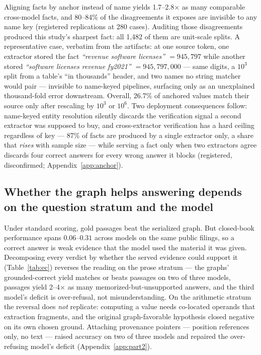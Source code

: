 \documentclass{article}
\begin{document}
Aligning facts by anchor instead of name yields 1.7--2.8$\times$ as many
comparable cross-model facts, and 80--84\% of the disagreements it exposes
are invisible to any name key (registered replications at 280 cases). Auditing those disagreements produced this study's sharpest fact: all
1,482 of them are unit-scale splits. A representative case, verbatim from
the artifacts: at one source token, one extractor stored the fact
\emph{``revenue software licenses'' $= 945{,}797$} while another stored
\emph{``software licenses revenue fy2021'' $= 945{,}797{,}000$} --- same
digits, a $10^3$ split from a table's ``in thousands'' header, and two
names no string matcher would pair --- invisible to name-keyed
pipelines, surfacing only as an unexplained thousand-fold error
downstream. Overall, 26.7\% of
anchored values match their source only after rescaling by $10^3$ or
$10^6$. Two deployment
consequences follow: name-keyed entity resolution silently discards the
verification signal a second extractor was supposed to buy, and cross-extractor
verification has a hard ceiling regardless of key --- 87\% of facts are
produced by a single extractor only, a share that \emph{rises} with
sample size --- while serving a fact only when two extractors agree
discards four correct answers for every wrong answer it blocks
(registered, disconfirmed; Appendix~\ref{app:anchor}).

\subsection{Whether the graph helps answering depends on the question
stratum and the model}

Under standard scoring, gold passages beat the serialized graph. But
closed-book performance spans $0.06$--$0.31$ across models on the same
public filings, so a correct answer is weak evidence that the model used the material it
was given.
Decomposing every verdict by whether the served evidence could support it
(Table~\ref{tab:ec}) reverses the reading on the prose stratum --- the
graphs' grounded-correct yield matches or beats passages on two of three
models, passages yield 2--4$\times$ as many memorized-but-unsupported
answers, and the third model's
deficit is over-refusal, not misunderstanding. On the arithmetic stratum
the reversal does \emph{not} replicate: computing a value needs co-located
operands that extraction fragments, and the original graph-favorable
hypothesis closed negative on its own chosen ground. Attaching provenance
pointers --- position references only, no text --- raised accuracy on two
of three models and repaired the over-refusing model's deficit
(Appendix~\ref{app:part2}).
\end{document}
